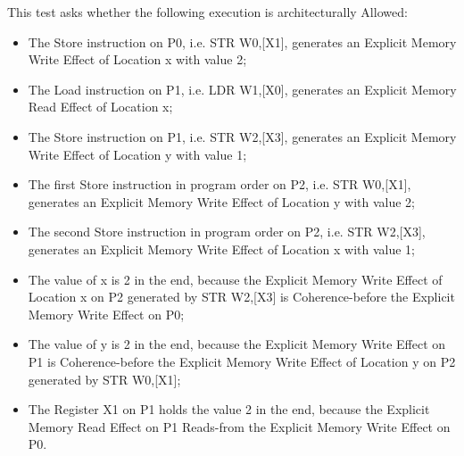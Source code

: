 This test asks whether the following execution is architecturally Allowed:

\begin{itemize}
  \item The Store instruction on P0, i.e. STR W0,[X1], generates an Explicit Memory Write Effect of Location x with value 2;
  \item The Load instruction on P1, i.e. LDR W1,[X0], generates an Explicit Memory Read Effect of Location x;
  \item The Store instruction on P1, i.e. STR W2,[X3], generates an Explicit Memory Write Effect of Location y with value 1;
  \item The first Store instruction in program order on P2, i.e. STR W0,[X1], generates an Explicit Memory Write Effect of Location y with value 2;
  \item The second Store instruction in program order on P2, i.e. STR W2,[X3], generates an Explicit Memory Write Effect of Location x with value 1;
  \item The value of x is 2 in the end, because the Explicit Memory Write Effect of Location x on P2 generated by STR W2,[X3] is Coherence-before the Explicit Memory Write Effect on P0;
  \item The value of y is 2 in the end, because the Explicit Memory Write Effect on P1 is Coherence-before the Explicit Memory Write Effect of Location y on P2 generated by STR W0,[X1];
  \item The Register X1 on P1 holds the value 2 in the end, because the Explicit Memory Read Effect on P1 Reads-from the Explicit Memory Write Effect on P0.
\end{itemize}

